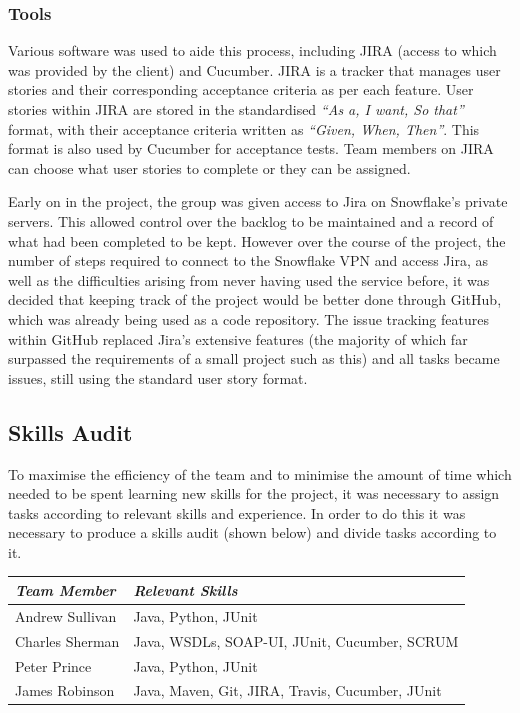 \documentclass[a4paper, 12pt, twoside]{article}
\begin{document}
\subsubsection{Tools}

Various software was used to aide this process, including JIRA (access to which was provided by the client) and Cucumber. JIRA is a tracker that manages user stories and their corresponding acceptance criteria as per each feature. User stories within JIRA are stored in the standardised \emph{``As a, I want, So that''} format, with their acceptance criteria written as \emph{``Given, When, Then''}. This format is also used by Cucumber for acceptance tests. Team members on JIRA can choose what user stories to complete or they can be assigned.

Early on in the project, the group was given access to Jira on Snowflake's private servers. This allowed control over the backlog to be maintained and a record of what had been completed to be kept. However over the course of the project, the number of steps required to connect to the Snowflake VPN and access Jira, as well as the difficulties arising from never having used the service before, it was decided that keeping track of the project would be better done through GitHub, which was already being used as a code repository. The issue tracking features within GitHub replaced Jira's extensive features (the majority of which far surpassed the requirements of a small project such as this) and all tasks became issues, still using the standard user story format.

\subsection{Skills Audit}
\label{sec:plan_skills_audit}
To maximise the efficiency of the team and to minimise the amount of time which needed to be spent learning new skills for the project, it was necessary to assign tasks according to relevant skills and experience. In order to do this it was necessary to produce a skills audit (shown below) and divide tasks according to it.

\begin{table}[h]
\begin{tabular}{|l|l|}
\hline
\emph{Team Member} & \emph{Relevant Skills}                           \\ \hline
Andrew Sullivan    & Java, Python, JUnit                              \\ \hline
Charles Sherman    & Java, WSDLs, SOAP-UI, JUnit, Cucumber, SCRUM     \\ \hline
Peter Prince       & Java, Python, JUnit                              \\ \hline
James Robinson     & Java, Maven, Git, JIRA, Travis, Cucumber, JUnit  \\ \hline
\end{tabular}
\end{table}
\end{document}
